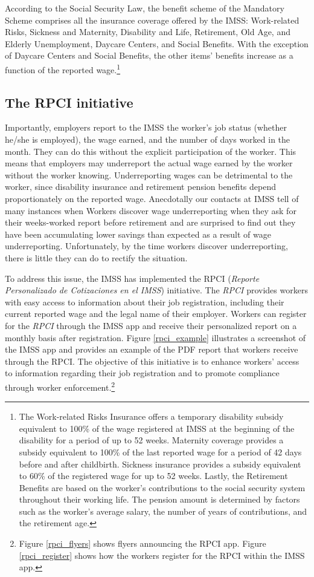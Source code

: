 \documentclass[oneside,11pt]{article}
\begin{document}
According to the Social Security Law, the benefit scheme of the Mandatory Scheme comprises all the insurance coverage offered by the IMSS: Work-related Risks, Sickness and Maternity, Disability and Life, Retirement, Old Age, and Elderly Unemployment, Daycare Centers, and Social Benefits.
With the exception of Daycare Centers and Social Benefits, the other items' benefits increase as a function of the reported wage.\footnote{The Work-related Risks Insurance offers a temporary disability subsidy equivalent to 100\% of the wage registered at IMSS at the beginning of the disability for a period of up to 52 weeks. Maternity coverage provides a subsidy equivalent to 100\% of the last reported wage for a period of 42 days before and after childbirth. Sickness insurance provides a subsidy equivalent to 60\% of the registered wage for up to 52 weeks. Lastly, the Retirement Benefits are based on the worker's contributions to the social security system throughout their working life. The pension amount is determined by factors such as the worker's average salary, the number of years of contributions, and the retirement age.}  


\subsection{The RPCI initiative}

Importantly, employers report to the IMSS the worker's job status (whether he/she is employed), the wage earned, and the number of days worked in the month. They can do this without the explicit participation of the worker. This means that employers may underreport the actual wage earned by the worker without the worker knowing. Underreporting wages can be detrimental to the worker, since disability insurance and retirement pension benefits depend proportionately on the reported wage. Anecdotally our contacts at IMSS tell of many instances when Workers discover wage underreporting when they ask for their weeks-worked report before retirement and are surprised to find out they have been accumulating lower savings than expected as a result of wage underreporting.  Unfortunately, by the time workers discover underreporting, there is little they can do to rectify the situation. 

To address this issue, the IMSS has implemented the RPCI (\textit{Reporte Personalizado de Cotizaciones en el IMSS}) initiative. The \textit{RPCI} provides workers with easy access to information about their job registration, including their current reported wage and the legal name of their employer. Workers can register for the \textit{RPCI} through the IMSS app and receive their personalized report on a monthly basis after registration. Figure \ref{rpci_example} illustrates a screenshot of the IMSS app and provides an example of the PDF report that workers receive through the RPCI. The objective of this initiative is to enhance workers' access to information regarding their job registration and to promote compliance through worker enforcement.\footnote{Figure \ref{rpci_flyers} shows flyers announcing the RPCI app. Figure \ref{rpci_register} shows how the workers register for the RPCI within the IMSS app.}
\end{document}
